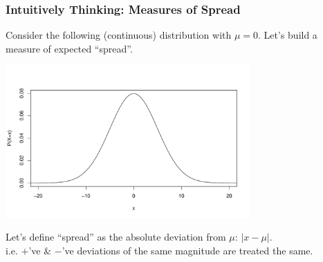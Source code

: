 \documentclass[slides]{beamer}
\newcommand{\blue}[1]{\textcolor{blue2}{#1}}
\begin{document}
%
%
%
%
\begin{frame}
\frametitle{Intuitively Thinking:  Measures of Spread}
Consider the following (continuous) distribution with $\mu=0$.  Let's build a measure of \blue{expected ``spread''}. 
\begin{center}
\includegraphics[width=0.7\textwidth]{figure/spread1}
\end{center}
\pause Let's define ``spread'' as the \blue{absolute deviation from $\mu$}: $|x - \mu|$.\\
i.e. $+$'ve \& $-$'ve deviations of the same magnitude are treated the same.

\end{frame}
\end{document}
